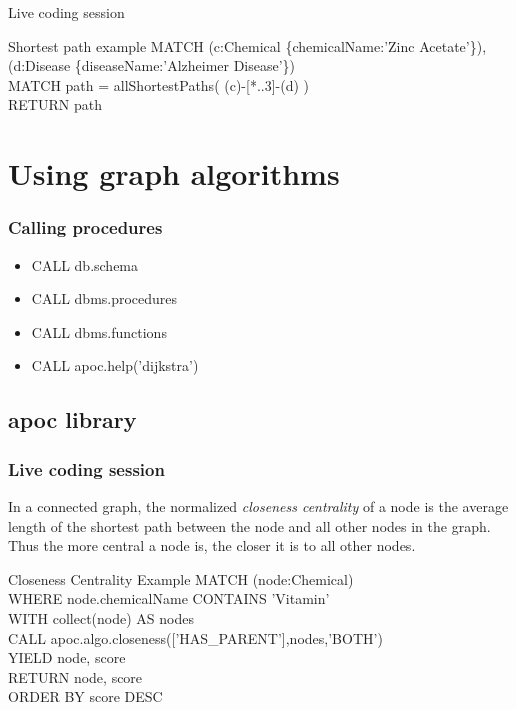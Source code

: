 \documentclass[12pt]{beamer}
\begin{document}
    \begin{frame}{Live coding session}
        \begin{block}{Shortest path example}
            MATCH (c:Chemical \{chemicalName:'Zinc Acetate'\}),\\
            \hspace{1cm} (d:Disease \{diseaseName:'Alzheimer Disease'\})\\
            MATCH path = allShortestPaths( (c)-[*..3]-(d) )\\
            RETURN path
        \end{block}
    \end{frame}
    
    \section{Using graph algorithms}
    \begin{frame}
        \frametitle{Calling procedures}
        \begin{itemize}
            \item CALL db.schema
            \item CALL dbms.procedures
            \item CALL dbms.functions
            \item CALL apoc.help('dijkstra')
        \end{itemize}
    \end{frame}
    
    \subsection{apoc library}
    \begin{frame}
        \frametitle{Live coding session}
        \begin{Definition}
            In a connected graph, the normalized \emph{closeness centrality} of a node is the average length of the shortest path between the node and all other nodes in the graph. Thus the more central a node is, the closer it is to all other nodes.\footnotemark
        \end{Definition}
        \begin{block}{Closeness Centrality Example}
            MATCH (node:Chemical)\\
            \hspace{1cm} WHERE node.chemicalName CONTAINS 'Vitamin'\\
            \hspace{1cm} WITH collect(node) AS nodes\\
            CALL apoc.algo.closeness(['HAS\_PARENT'],nodes,'BOTH')\\
            \hspace{1cm} YIELD node, score\\
            RETURN node, score\\
            \hspace{1cm} ORDER BY score DESC
        \end{block}
    \end{frame}
    
\end{document}
